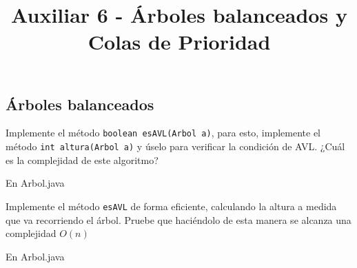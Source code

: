 \documentclass[dcc,sol]{fcfmcourse}
\title{Auxiliar 6 - Árboles balanceados y Colas de Prioridad}
\begin{document}
\maketitle

\vspace{-1ex}

\begin{problems}
\section*{Árboles balanceados}
\problem Implemente el método \texttt{boolean esAVL(Arbol a)}, para esto, implemente el método \texttt{int altura(Arbol a)} y úselo para verificar la condición de AVL. ¿Cuál es la complejidad de este algoritmo?
\begin{solution}
En Arbol.java
\end{solution}
\problem Implemente el método \texttt{esAVL} de forma eficiente, calculando la altura a medida que va recorriendo el árbol. Pruebe que haciéndolo de esta manera se alcanza una complejidad $O(n)$
\begin{solution}
En Arbol.java
\end{solution}
\end{problems}
\end{document}
